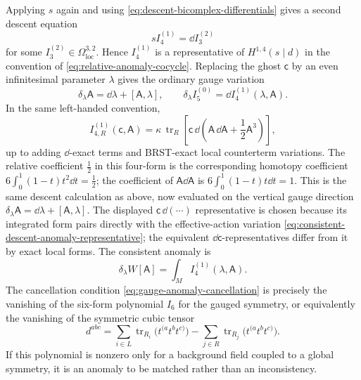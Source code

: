 Applying \(s\) again and using \eqref{eq:descent-bicomplex-differentials}
gives a second descent equation
\begin{equation}
  s I_4^{(1)}
  =
  \dd I_3^{(2)}
  \label{eq:second-brst-descent}
\end{equation}
for some \(I_3^{(2)}\in\Omega_{\mathrm{loc}}^{3,2}\).  Hence
\(I_4^{(1)}\) is a representative of \(H^{1,4}(s\mid d)\) in the convention
of \eqref{eq:relative-anomaly-cocycle}.  Replacing the ghost \(\mathsf c\) by
an even infinitesimal parameter \(\lambda\) gives the ordinary gauge variation
\[
  \delta_\lambda \mathsf A=\dd\lambda+[\mathsf A,\lambda],
  \qquad
  \delta_\lambda I_5^{(0)}
  =
  \dd I_4^{(1)}(\lambda,\mathsf A).
\]
In the same left-handed convention,
\[
  I_{4,R}^{(1)}(\mathsf c,\mathsf A)
  =
  \kappa\,\operatorname{tr}_R
  \left[
    \mathsf c\,\dd
    \left(
      \mathsf A\,\dd\mathsf A+\frac12\mathsf A^3
    \right)
  \right],
\]
up to adding \(\dd\)-exact terms and BRST-exact local counterterm variations.
The relative coefficient \(\frac12\) in this four-form is the corresponding
homotopy coefficient \(6\int_0^1(1-t)t^2\dd t=\frac12\); the coefficient of
\(\mathsf A\dd\mathsf A\) is \(6\int_0^1(1-t)t\dd t=1\).  This is the same
descent calculation as above, now evaluated on the vertical gauge direction
\(\delta_\lambda\mathsf A=\dd\lambda+[\mathsf A,\lambda]\).  The displayed
\(\mathsf c\,\dd(\cdots)\) representative is chosen because its integrated
form pairs directly with the effective-action variation
\eqref{eq:consistent-descent-anomaly-representative}; the equivalent
\(\dd\mathsf c\)-representatives differ from it by exact local forms.
The consistent anomaly is
\begin{equation}
  \delta_\lambda W[\mathsf A]
  =
  \int_M I_4^{(1)}(\lambda,\mathsf A).
  \label{eq:consistent-descent-anomaly-representative}
\end{equation}
The cancellation condition \eqref{eq:gauge-anomaly-cancellation} is precisely
the vanishing of the six-form polynomial \(I_6\) for the gauged symmetry, or
equivalently the vanishing of the symmetric cubic tensor
\[
  d^{abc}
  =
  \sum_{i\in L}\operatorname{tr}_{R_i}
  \bigl(t^{(a}t^b t^{c)}\bigr)
  -
  \sum_{j\in R}\operatorname{tr}_{R_j}
  \bigl(t^{(a}t^b t^{c)}\bigr).
\]
If this polynomial is nonzero only for a background field coupled to a global
symmetry, it is an anomaly to be matched rather than an inconsistency.

